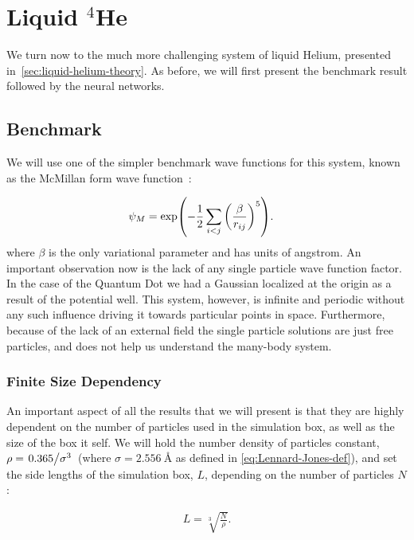 \documentclass[Thesis.tex]{subfiles}
\begin{document}
\chapter{Liquid $^4$He}
\label{chp:liquid-helium}

We turn now to the much more challenging system of liquid Helium, presented
in~\cref{sec:liquid-helium-theory}. As before, we will first present the
benchmark result followed by the neural networks.


\section{Benchmark}

We will use one of the simpler benchmark wave functions for this system, known
as the McMillan form wave function~\cite{McMillan-1965}:

\begin{align}
  \label{eq:McMillan-wave-function-def}
  \psi_{M} &= \exp(-\frac{1}{2}\sum_{i<j} \qty(\frac{\beta}{r_{ij}})^5).
\end{align}
where $\beta$ is the only variational parameter and has units of angstrom. An
important observation now is the lack of any single particle wave function
factor. In the case of the Quantum Dot we had a Gaussian localized at the origin
as a result of the potential well. This system, however, is infinite and
periodic without any such influence driving it towards particular points in
space. Furthermore, because of the lack of an external field the single particle
solutions are just free particles, and does not help us understand the many-body
system.

\subsection{Finite Size Dependency}

An important aspect of all the results that we will present is that they are
highly dependent on the number of particles used in the simulation box, as well
as the size of the box it self. We will hold the number density of particles
constant, $\rho = \flatfrac{\num{0.365}}{\sigma^3}$ (where $\sigma =
\SI{2.556}{\angstrom}$ as defined in \cref{eq:Lennard-Jones-def}), and set the
side lengths of the simulation box, $L$, depending on
the number of particles $N$:

\begin{align}
  L = \sqrt[3]{\frac{N}{\rho}}.
\end{align}
\end{document}
